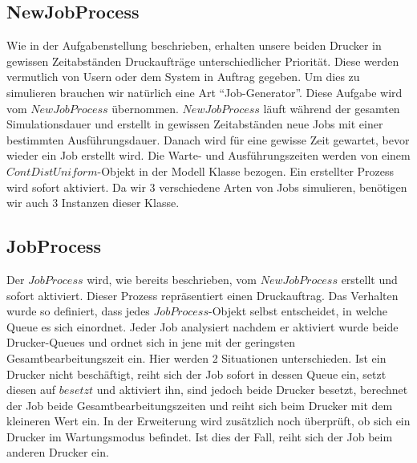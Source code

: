 \documentclass[12pt,a4paper]{article}
\begin{document}
	\subsection{NewJobProcess}
	Wie in der Aufgabenstellung beschrieben, erhalten unsere beiden Drucker in gewissen Zeitabständen Druckaufträge unterschiedlicher Priorität. Diese werden vermutlich von Usern oder dem System
	in Auftrag gegeben. Um dies zu simulieren brauchen wir natürlich eine Art ``Job-Generator''. Diese Aufgabe wird vom $NewJobProcess$ übernommen. $NewJobProcess$ läuft während der gesamten 
	Simulationsdauer und erstellt in gewissen Zeitabständen neue Jobs mit einer bestimmten Ausführungsdauer. Danach wird für eine gewisse Zeit gewartet, bevor wieder ein Job erstellt wird. Die Warte-
	und Ausführungszeiten werden von einem $ContDistUniform$-Objekt in der Modell Klasse bezogen. Ein erstellter Prozess wird sofort aktiviert. Da wir 3 verschiedene Arten von Jobs simulieren, benötigen 
	wir auch 3 Instanzen dieser Klasse.
	
	\subsection{JobProcess}
	Der $JobProcess$ wird, wie bereits beschrieben, vom $NewJobProcess$ erstellt und sofort aktiviert. Dieser Prozess repräsentiert einen Druckauftrag. Das Verhalten wurde so definiert, dass jedes
	$JobProcess$-Objekt selbst entscheidet, in welche Queue es sich einordnet. Jeder Job analysiert nachdem er aktiviert wurde beide Drucker-Queues und ordnet sich in jene mit der geringsten
	Gesamtbearbeitungszeit ein. Hier werden 2 Situationen unterschieden. Ist ein Drucker nicht beschäftigt, reiht sich der Job sofort in dessen Queue ein, setzt diesen auf $besetzt$ und aktiviert ihn, sind 
	jedoch beide Drucker besetzt, berechnet der Job beide Gesamtbearbeitungszeiten und reiht sich beim Drucker mit dem kleineren Wert ein. In der Erweiterung wird zusätzlich noch überprüft, ob sich ein 
	Drucker im	Wartungsmodus befindet. Ist dies der Fall, reiht sich der Job beim anderen Drucker ein.
	
\end{document}
